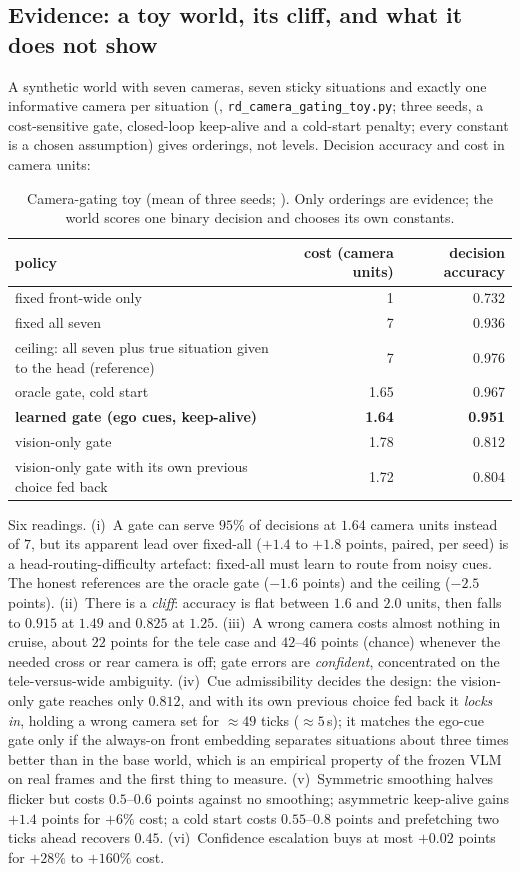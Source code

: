 \subsection{Evidence: a toy world, its cliff, and what it does not show}
A synthetic world with seven cameras, seven sticky situations and exactly one informative camera per situation (\evM{}, \texttt{rd\_camera\_gating\_toy.py}; three seeds, a cost-sensitive gate, closed-loop keep-alive and a cold-start penalty; every constant is a chosen assumption) gives orderings, not levels. Decision accuracy and cost in camera units:
\begin{table}[h]
\centering\small
\caption{Camera-gating toy (mean of three seeds; \evM). Only orderings are evidence; the world scores one binary decision and chooses its own constants.}
\label{tab:gate}
\begin{tabular}{@{}lrr@{}}
\toprule
policy & cost (camera units) & decision accuracy \\ \midrule
fixed front-wide only & 1 & 0.732 \\
fixed all seven & 7 & 0.936 \\
ceiling: all seven plus true situation given to the head (reference) & 7 & 0.976 \\
oracle gate, cold start & 1.65 & 0.967 \\
\textbf{learned gate (ego cues, keep-alive)} & \textbf{1.64} & \textbf{0.951} \\
vision-only gate & 1.78 & 0.812 \\
vision-only gate with its own previous choice fed back & 1.72 & 0.804 \\
\bottomrule
\end{tabular}
\end{table}
Six readings. (i)~A gate can serve $95\%$ of decisions at $1.64$ camera units instead of $7$, but its apparent lead over fixed-all ($+1.4$ to $+1.8$ points, paired, per seed) is a head-routing-difficulty artefact: fixed-all must learn to route from noisy cues. The honest references are the oracle gate ($-1.6$ points) and the ceiling ($-2.5$ points).
(ii)~There is a \emph{cliff}: accuracy is flat between $1.6$ and $2.0$ units, then falls to $0.915$ at $1.49$ and $0.825$ at $1.25$. (iii)~A wrong camera costs almost nothing in cruise, about $22$ points for the tele case and $42$--$46$ points (chance) whenever the needed cross or rear camera is off; gate errors are \emph{confident}, concentrated on the tele-versus-wide ambiguity.
(iv)~Cue admissibility decides the design: the vision-only gate reaches only $0.812$, and with its own previous choice fed back it \emph{locks in}, holding a wrong camera set for $\approx49$ ticks ($\approx5$\,s); it matches the ego-cue gate only if the always-on front embedding separates situations about three times better than in the base world, which is an empirical property of the frozen VLM on real frames and the first thing to measure. (v)~Symmetric smoothing halves flicker but costs $0.5$--$0.6$ points against no smoothing; asymmetric keep-alive gains $+1.4$ points for $+6\%$ cost; a cold start costs $0.55$--$0.8$ points and prefetching two ticks ahead recovers $0.45$. (vi)~Confidence escalation buys at most $+0.02$ points for $+28\%$ to $+160\%$ cost.
